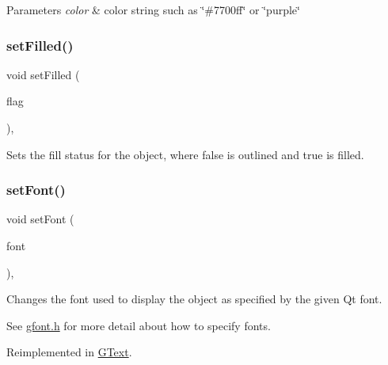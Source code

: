 \begin{DoxyParams}{Parameters}
{\em color} & color string such as \char`\"{}\#7700ff\char`\"{} or \char`\"{}purple\char`\"{} \\
\hline
\end{DoxyParams}
\mbox{\label{classsgl_1_1GObject_a9b82b53362282c6bb7d6947068d2e55b}} 
\subsubsection{\texorpdfstring{set\+Filled()}{setFilled()}}
{\footnotesize\ttfamily void set\+Filled (\begin{DoxyParamCaption}\item[{bool}]{flag }\end{DoxyParamCaption})\hspace{0.3cm}{\ttfamily [virtual]}, {\ttfamily [inherited]}}



Sets the fill status for the object, where {\ttfamily false} is outlined and {\ttfamily true} is filled. 

\mbox{\label{classsgl_1_1GObject_a2592348886ffea646c6534bf88f7c49d}} 
\subsubsection{\texorpdfstring{set\+Font()}{setFont()}\hspace{0.1cm}{\footnotesize\ttfamily [1/2]}}
{\footnotesize\ttfamily void set\+Font (\begin{DoxyParamCaption}\item[{const Q\+Font \&}]{font }\end{DoxyParamCaption})\hspace{0.3cm}{\ttfamily [virtual]}, {\ttfamily [inherited]}}



Changes the font used to display the object as specified by the given Qt font. 

See \mbox{\hyperlink{gfont_8h_source}{gfont.\+h}} for more detail about how to specify fonts. 

Reimplemented in \mbox{\hyperlink{classsgl_1_1GText_ad1d75b3840a41ba7d1e8a921696dc684}{G\+Text}}.

